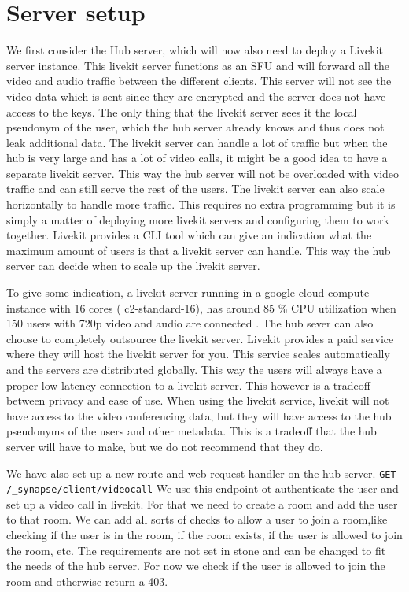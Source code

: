 \documentclass{report}
\begin{document}
\section{Server setup}
We first consider the Hub server, which will now also need to deploy a Livekit server instance. This livekit server
functions as an SFU and will forward all the video and audio traffic between the different clients. This server will
not see the video data which is sent since they are encrypted and the server does not have access to the keys. The
only thing that the livekit server sees it the local pseudonym of the user, which the hub server already knows and
thus does not leak additional data. The livekit server can handle a lot of traffic but when the hub is very large
and has a lot of video calls, it might be a good idea to have a separate livekit server. This way the hub server
will not be overloaded with video traffic and can still serve the rest of the users. The livekit server can also
scale horizontally to handle more traffic. This requires no extra programming but it is simply a matter of deploying
more livekit servers and configuring them to work together. Livekit provides a CLI tool which can give an
indication what the maximum amount of users is that a livekit server can handle. This way the hub server can decide
when to scale up the livekit server.

To give some indication, a livekit server running in a google cloud compute instance with 16 cores (
c2-standard-16), has around 85 \% CPU utilization when 150 users with 720p video and audio are connected
\cite{noauthor_benchmarking_nodate}. The hub sever can also choose to completely outsource the livekit server.
Livekit provides a paid service where they will host the livekit server for you. This service scales
automatically and the servers are distributed globally. This way the users will always have a proper low
latency connection to a livekit server. This however is a tradeoff between privacy and ease of use. When using
the livekit service, livekit will not have access to the video conferencing data, but they will have access to
the hub pseudonyms of the users and other metadata. This is a tradeoff that the hub server will have to make,
but we do not recommend that they do.

We have also set up a new route and web request handler on the hub server.
\texttt{GET /\_synapse/client/videocall} We use this endpoint ot authenticate the user and set up a video call
in livekit. For that we need to create a room and add the user to that room. We can add all sorts of checks to allow
a user to join a room,like checking if the user is in the room, if the room exists, if the user is allowed to
join the room, etc. The requirements are not set in stone and can be changed to fit the needs of the hub server.
For now we check if the user is allowed to join the room and otherwise return a 403.
\end{document}
